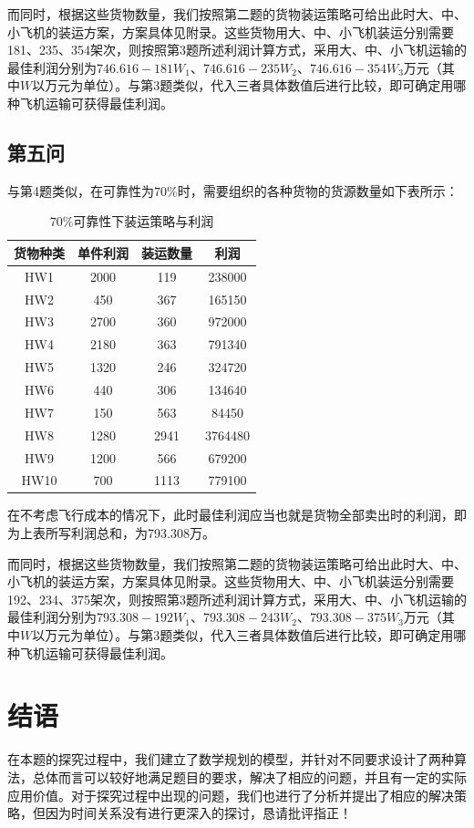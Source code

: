 \documentclass{article}
\begin{document}
	而同时，根据这些货物数量，我们按照第二题的货物装运策略可给出此时大、中、小飞机的装运方案，方案具体见附录。这些货物用大、中、小飞机装运分别需要181、235、354架次，则按照第3题所述利润计算方式，采用大、中、小飞机运输的最佳利润分别为$746.616-181W_1$、$746.616-235W_2$、$746.616-354W_3$万元（其中$W$以万元为单位）。与第3题类似，代入三者具体数值后进行比较，即可确定用哪种飞机运输可获得最佳利润。
	
	\newpage
	\subsection{第五问}
	与第4题类似，在可靠性为$70\%$时，需要组织的各种货物的货源数量如下表所示：
	
	\begin{table}[!h]
		\centering
		\caption{$70\%$可靠性下装运策略与利润}
		\begin{tabular}{|c|c|c|c|}
			\hline
			货物种类 & 单件利润 & 装运数量 & 利润      \\ \hline
			HW1  & 2000 & 119  & 238000  \\ \hline
			HW2  & 450  & 367  & 165150  \\ \hline
			HW3  & 2700 & 360  & 972000  \\ \hline
			HW4  & 2180 & 363  & 791340  \\ \hline
			HW5  & 1320 & 246  & 324720  \\ \hline
			HW6  & 440  & 306  & 134640  \\ \hline
			HW7  & 150  & 563  & 84450   \\ \hline
			HW8  & 1280 & 2941 & 3764480 \\ \hline
			HW9  & 1200 & 566  & 679200  \\ \hline
			HW10 & 700  & 1113 & 779100  \\ \hline
		\end{tabular}
	\end{table}

	在不考虑飞行成本的情况下，此时最佳利润应当也就是货物全部卖出时的利润，即为上表所写利润总和，为793.308万。
	
	而同时，根据这些货物数量，我们按照第二题的货物装运策略可给出此时大、中、小飞机的装运方案，方案具体见附录。这些货物用大、中、小飞机装运分别需要192、234、375架次，则按照第3题所述利润计算方式，采用大、中、小飞机运输的最佳利润分别为$793.308-192W_1$、$793.308-243W_2$、$793.308-375W_3$万元（其中$W$以万元为单位）。与第3题类似，代入三者具体数值后进行比较，即可确定用哪种飞机运输可获得最佳利润。

	\section{结语}
	在本题的探究过程中，我们建立了数学规划的模型，并针对不同要求设计了两种算法，总体而言可以较好地满足题目的要求，解决了相应的问题，并且有一定的实际应用价值。对于探究过程中出现的问题，我们也进行了分析并提出了相应的解决策略，但因为时间关系没有进行更深入的探讨，恳请批评指正！
	
\end{document}
